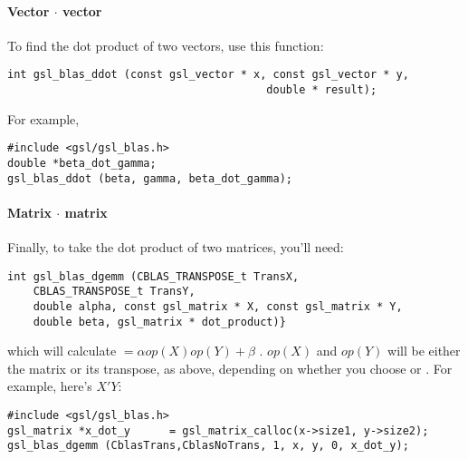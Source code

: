 \paragraph{Vector $\cdot$ vector}
To find the dot product of two vectors, use this function:
\begin{lstlisting}
int gsl_blas_ddot (const gsl_vector * x, const gsl_vector * y, 
                                        double * result);
\end{lstlisting}


For example,

\begin{lstlisting}
#include <gsl/gsl_blas.h>
double *beta_dot_gamma;
gsl_blas_ddot (beta, gamma, beta_dot_gamma);
\end{lstlisting}

\paragraph{Matrix $\cdot$ matrix}
Finally, to take the dot product of two matrices, you'll need:
\begin{lstlisting}
int gsl_blas_dgemm (CBLAS_TRANSPOSE_t TransX, 
    CBLAS_TRANSPOSE_t TransY, 
    double alpha, const gsl_matrix * X, const gsl_matrix * Y, 
    double beta, gsl_matrix * dot_product)}
\end{lstlisting}

which will calculate  $= \alpha op(X) op(Y) + \beta$ . $op(X)$ and
$op(Y)$ will be either the matrix or its transpose, as above, depending on whether you choose 
or . For example, here's $X'Y$:

\begin{lstlisting}
#include <gsl/gsl_blas.h>
gsl_matrix *x_dot_y      = gsl_matrix_calloc(x->size1, y->size2);
gsl_blas_dgemm (CblasTrans,CblasNoTrans, 1, x, y, 0, x_dot_y);
\end{lstlisting}

